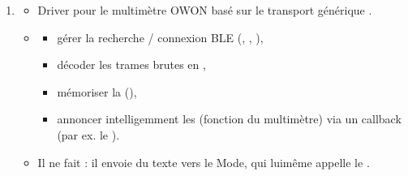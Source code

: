 \documentclass[letterpaper,10pt,french]{sphinxmanual}
\begin{document}
\begin{enumerate}
\begin{itemize}
\begin{description}
\end{description}

\end{itemize}

\item {} \begin{itemize}
\item {} 
\sphinxAtStartPar
Driver  pour le multimètre OWON basé sur le transport générique .

\item {} \begin{description}
\begin{itemize}
\item {} 
\sphinxAtStartPar
gérer la recherche / connexion BLE (, , ),

\item {} 
\sphinxAtStartPar
décoder les trames brutes en ,

\item {} 
\sphinxAtStartPar
mémoriser la  (),

\item {} 
\sphinxAtStartPar
annoncer intelligemment les  (fonction du multimètre)
via un callback  (par ex. le ).

\end{itemize}

\end{description}

\item {} 
\sphinxAtStartPar
Il ne fait  : il envoie du texte vers le Mode,
qui lui\sphinxhyphen{}même appelle le .

\end{itemize}

\end{enumerate}
\end{document}
